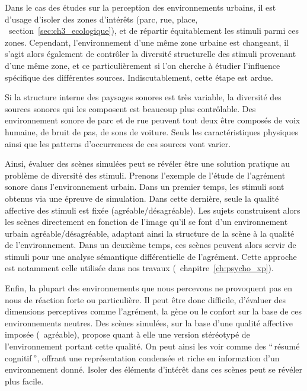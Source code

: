 \begin{itemize}
Dans le cas des études sur la perception des environnements urbains, il est d'usage d'isoler des zones d’intérêts (parc, rue, place, \cf~section~\ref{sec:ch3_ecologique}), et de répartir équitablement les stimuli parmi ces zones. Cependant, l'environnement d'une même zone urbaine est changeant, il s'agit alors également de contrôler la diversité structurelle des stimuli provenant d'une même zone, et ce particulièrement si l'on cherche à étudier l'influence spécifique des différentes sources. Indiscutablement, cette étape est ardue. 

Si la structure interne des paysages sonores est très variable, la diversité des sources sonores  qui les composent est beaucoup plus contrôlable. Des environnement sonore de parc et de rue peuvent tout deux être composés de voix humaine, de bruit de pas, de sons de voiture. Seuls les caractéristiques physiques ainsi que les patterns d'occurrences de ces sources vont varier.

Ainsi, évaluer des scènes simulées peut se révéler être une solution pratique au problème de diversité des stimuli. Prenons l'exemple de l'étude de l'agrément sonore dans l'environnement urbain. Dans un premier temps, les stimuli sont obtenus via une épreuve de simulation. Dans cette dernière, seule la qualité affective des stimuli est fixée (agréable/désagréable). Les sujets construisent alors les scènes directement en fonction de l'image qu'il se font d'un environnement urbain agréable/désagréable, adaptant ainsi la structure de la scène à la qualité de l'environnement. Dans un deuxième temps, ces scènes peuvent alors servir de stimuli pour une analyse sémantique différentielle de l'agrément. Cette approche est notamment celle utilisée dans nos travaux (\cf~chapitre~\ref{ch:psycho_xp}).

Enfin, la plupart des environnements que nous percevons ne provoquent pas en nous de réaction forte ou particulière. Il peut être donc difficile, d'évaluer des dimensions perceptives comme l'agrément, la gène ou le confort sur la base de ces environnements neutres. Des scènes simulées, sur la base d'une qualité affective imposée (\eg~agréable), propose quant à elle une version stéréotypé de l'environnement portant cette qualité. On peut ainsi les voir comme des ``\,résumé cognitif\,'', offrant une représentation condensée et riche en information d'un environnement donné. Isoler des éléments d'intérêt dans ces scènes peut se révéler plus facile. 
\end{itemize}

